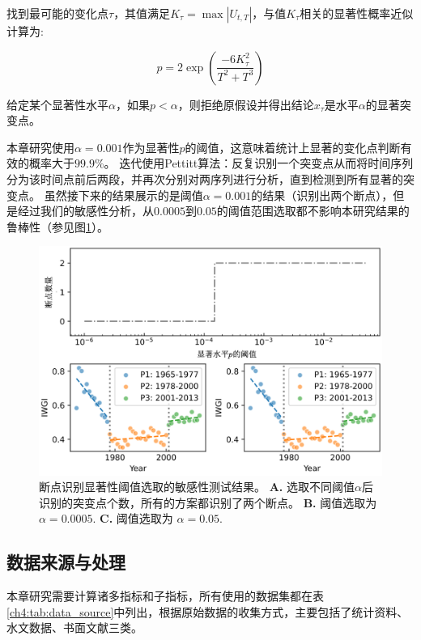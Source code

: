 找到最可能的变化点$\tau$，其值满足$K_{\tau} = \max|U_{t, T}|$，与值$K_{\tau}$相关的显著性概率近似计算为:

\begin{equation}
    p=2 \exp \left(\frac{-6 K_{\tau}^{2}}{T^{2}+T^{3}}\right)
\end{equation}

给定某个显著性水平$\alpha$，如果$p < \alpha$，则拒绝原假设并得出结论$x_{\tau}$是水平$\alpha$的显著突变点。

本章研究使用$\alpha = 0.001$作为显著性$p$的阈值，这意味着统计上显著的变化点判断有效的概率大于$99.9\%$。
迭代使用Pettitt算法：反复识别一个突变点从而将时间序列分为该时间点前后两段，并再次分别对两序列进行分析，直到检测到所有显著的突变点。
虽然接下来的结果展示的是阈值$\alpha = 0.001$的结果（识别出两个断点），但是经过我们的敏感性分析，从$0.0005$到$0.05$的阈值范围选取都不影响本研究结果的鲁棒性（参见图\ref{ch4:fig:sensitivity}）。

\begin{figure}[htb] %
    \includegraphics[width=\textwidth]{img/ch4/ch4_sensitivity.png}
    \caption[断点识别显著性阈值选取的敏感性测试]{断点识别显著性阈值选取的敏感性测试结果。
    \textbf{A.} 选取不同阈值$\alpha$后识别的突变点个数，所有的方案都识别了两个断点。
    \textbf{B.} 阈值选取为 $\alpha=0.0005$.
    \textbf{C.} 阈值选取为 $\alpha=0.05$.}\label{ch4:fig:sensitivity}
\end{figure}

\subsection{数据来源与处理}
本章研究需要计算诸多指标和子指标，所有使用的数据集都在表\ref{ch4:tab:data_source}中列出，根据原始数据的收集方式，主要包括了统计资料、水文数据、书面文献三类。

